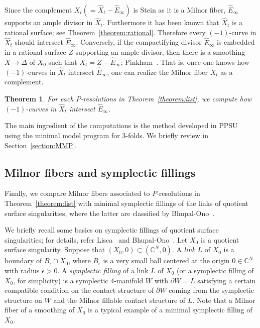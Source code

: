 \documentclass[reqno, twoside, a4paper]{amsart}
\newtheorem{theorem}{Theorem}[section]
\theoremstyle{definition}
\numberwithin{equation}{section}
\begin{document}
Since the complement $X_t (=\widehat{X}_t - \widehat{E}_{\infty})$ is Stein as it is a Milnor fiber, $\widehat{E}_{\infty}$ supports an ample divisor in $\widehat{X}_t$. Furthermore it has been known that $\widehat{X}_t$ is a rational surface; see Theorem~\ref{theorem:rational}. Therefore every $(-1)$-curve in $\widehat{X}_t$ should intersect $\widehat{E}_{\infty}$. Conversely, if the compactifying divisor $\widehat{E}_{\infty}$ is embedded in a rational surface $Z$ supporting an ample divisor, then there is a smoothing $X \to \Delta$ of $X_0$ such that $X_t = Z - \widehat{E}_{\infty}$; Pinkham~\cite[Theorem~6.7]{Pinkham-1978}. That is, once one knows how $(-1)$-curves in $\widehat{X}_t$ intersect $\widehat{E}_{\infty}$, one can realize the Milnor fiber $X_t$ as a complement.

\begin{theorem}
For each $P$-resolutions in Theorem~\ref{theorem:list}, we compute how $(-1)$-curves in $\widehat{X}_t$ intersect $\widehat{E}_{\infty}$.
\end{theorem}

The main ingredient of the computations is the method developed in PPSU~\cite{PPSU-2015} using the minimal model program for 3-folds. We briefly review in Section~\ref{section:MMP}.






\subsection{Milnor fibers and symplectic fillings}

Finally, we compare Milnor fibers associated to $P$-resolutions in Theorem~\ref{theorem:list} with minimal symplectic fillings of the links of quotient surface singularities, where the latter are classified by Bhupal-Ono~\cite{Bhupal-Ono-2012}.

We briefly recall some basics on symplectic fillings of quotient surface singularities; for details, refer Lisca~\cite{Lisca-2008} and Bhupal-Ono~\cite{Bhupal-Ono-2012}. Let $X_0$ is a quotient surface singularity. Suppose that $(X_0,0) \subset (\mathbb{C}^N,0)$. A \emph{link} $L$ of $X_0$ is a boundary of $B_{\epsilon} \cap X_0$, where $B_{\epsilon}$ is a very small ball centered at the origin $0 \in \mathbb{C}^N$ with radius $\epsilon > 0$. A \emph{symplectic filling} of a link $L$ of $X_0$ (or a symplectic filling of $X_0$, for simplicity) is a symplectic $4$-manifold $W$ with $\partial W = L$ satisfying a certain compatible condition on the contact structure of $\partial W$ coming from the symplectic structure on $W$ and the Milnor fillable contact structure of $L$. Note that a Milnor fiber of a smoothing of $X_0$ is a typical example of a minimal symplectic filling of $X_0$.
\end{document}
